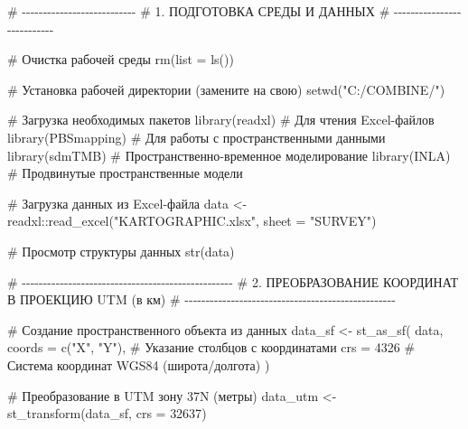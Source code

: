 \documentclass[
  letterpaper,
  DIV=11,
  numbers=noendperiod]{scrreprt}
\newenvironment{Shaded}{\begin{snugshade}}{\end{snugshade}}
\newcommand{\AttributeTok}[1]{\textcolor[rgb]{0.40,0.45,0.13}{#1}}
\newcommand{\CommentTok}[1]{\textcolor[rgb]{0.37,0.37,0.37}{#1}}
\newcommand{\DecValTok}[1]{\textcolor[rgb]{0.68,0.00,0.00}{#1}}
\newcommand{\FunctionTok}[1]{\textcolor[rgb]{0.28,0.35,0.67}{#1}}
\newcommand{\NormalTok}[1]{\textcolor[rgb]{0.00,0.23,0.31}{#1}}
\newcommand{\OtherTok}[1]{\textcolor[rgb]{0.00,0.23,0.31}{#1}}
\newcommand{\SpecialCharTok}[1]{\textcolor[rgb]{0.37,0.37,0.37}{#1}}
\newcommand{\StringTok}[1]{\textcolor[rgb]{0.13,0.47,0.30}{#1}}
\begin{document}
\begin{Shaded}
\begin{Highlighting}[]
\CommentTok{\# {-}{-}{-}{-}{-}{-}{-}{-}{-}{-}{-}{-}{-}{-}{-}{-}{-}{-}{-}{-}{-}{-}{-}{-}{-}{-}{-}}
\CommentTok{\# 1. ПОДГОТОВКА СРЕДЫ И ДАННЫХ}
\CommentTok{\# {-}{-}{-}{-}{-}{-}{-}{-}{-}{-}{-}{-}{-}{-}{-}{-}{-}{-}{-}{-}{-}{-}{-}{-}{-}{-}{-}}

\CommentTok{\# Очистка рабочей среды}
\FunctionTok{rm}\NormalTok{(}\AttributeTok{list =} \FunctionTok{ls}\NormalTok{())}

\CommentTok{\# Установка рабочей директории (замените на свою)}
\FunctionTok{setwd}\NormalTok{(}\StringTok{"C:/COMBINE/"}\NormalTok{)}

\CommentTok{\# Загрузка необходимых пакетов}
\FunctionTok{library}\NormalTok{(readxl)       }\CommentTok{\# Для чтения Excel{-}файлов}
\FunctionTok{library}\NormalTok{(PBSmapping)   }\CommentTok{\# Для работы с пространственными данными}
\FunctionTok{library}\NormalTok{(sdmTMB)       }\CommentTok{\# Пространственно{-}временное моделирование}
\FunctionTok{library}\NormalTok{(INLA)         }\CommentTok{\# Продвинутые пространственные модели}

\CommentTok{\# Загрузка данных из Excel{-}файла}
\NormalTok{data }\OtherTok{\textless{}{-}}\NormalTok{ readxl}\SpecialCharTok{::}\FunctionTok{read\_excel}\NormalTok{(}\StringTok{"KARTOGRAPHIC.xlsx"}\NormalTok{, }\AttributeTok{sheet =} \StringTok{"SURVEY"}\NormalTok{)}

\CommentTok{\# Просмотр структуры данных}
\FunctionTok{str}\NormalTok{(data)}


\CommentTok{\# {-}{-}{-}{-}{-}{-}{-}{-}{-}{-}{-}{-}{-}{-}{-}{-}{-}{-}{-}{-}{-}{-}{-}{-}{-}{-}{-}{-}{-}{-}{-}{-}{-}{-}{-}{-}{-}{-}{-}{-}{-}{-}{-}{-}{-}{-}{-}{-}{-}{-}}
\CommentTok{\# 2. ПРЕОБРАЗОВАНИЕ КООРДИНАТ В ПРОЕКЦИЮ UTM (в км)}
\CommentTok{\# {-}{-}{-}{-}{-}{-}{-}{-}{-}{-}{-}{-}{-}{-}{-}{-}{-}{-}{-}{-}{-}{-}{-}{-}{-}{-}{-}{-}{-}{-}{-}{-}{-}{-}{-}{-}{-}{-}{-}{-}{-}{-}{-}{-}{-}{-}{-}{-}{-}{-}}

\CommentTok{\# Создание пространственного объекта из данных}
\NormalTok{data\_sf }\OtherTok{\textless{}{-}} \FunctionTok{st\_as\_sf}\NormalTok{(}
\NormalTok{  data, }
  \AttributeTok{coords =} \FunctionTok{c}\NormalTok{(}\StringTok{"X"}\NormalTok{, }\StringTok{"Y"}\NormalTok{), }\CommentTok{\# Указание столбцов с координатами}
  \AttributeTok{crs =} \DecValTok{4326}            \CommentTok{\# Система координат WGS84 (широта/долгота)}
\NormalTok{) }

\CommentTok{\# Преобразование в UTM зону 37N (метры)}
\NormalTok{data\_utm }\OtherTok{\textless{}{-}} \FunctionTok{st\_transform}\NormalTok{(data\_sf, }\AttributeTok{crs =} \DecValTok{32637}\NormalTok{) }


\end{Highlighting}
\end{Shaded}
\end{document}
